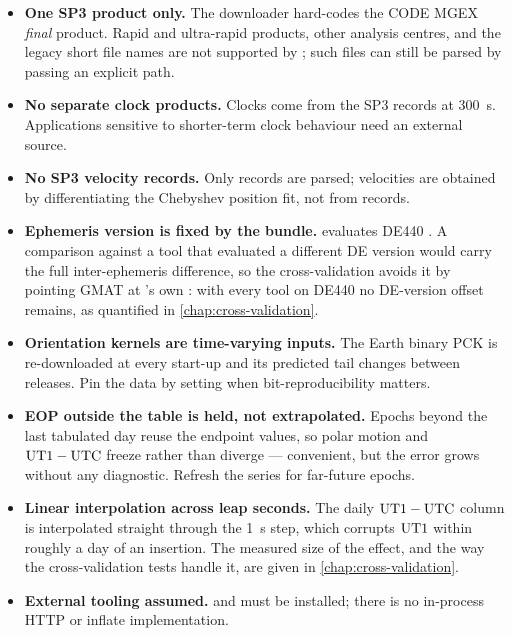 \begin{itemize}[leftmargin=1.4em]
  \item \textbf{One SP3 product only.} The downloader hard-codes the CODE
    MGEX \emph{final} product. Rapid and ultra-rapid products, other analysis
    centres, and the legacy short file names are not supported by
    ; such files can still be parsed by passing an
    explicit path.
  \item \textbf{No separate clock products.} Clocks come from the SP3 records
    at \SI{300}{\second}. Applications sensitive to shorter-term clock
    behaviour need an external  source.
  \item \textbf{No SP3 velocity records.} Only  records are parsed;
    velocities are obtained by differentiating the Chebyshev position fit, not
    from  records.
  \item \textbf{Ephemeris version is fixed by the bundle.} \lupnt{} evaluates
    DE440 \citep{park2021de440}. A comparison against a tool that evaluated a
    different DE version would carry the full inter-ephemeris difference, so
    the cross-validation avoids it by pointing GMAT at \lupnt{}'s own
    : with every tool on DE440 no DE-version offset remains,
    as quantified in \cref{chap:cross-validation}.
  \item \textbf{Orientation kernels are time-varying inputs.} The Earth binary
    PCK is re-downloaded at every start-up and its predicted tail changes
    between releases. Pin the data by setting
     when bit-reproducibility
    matters.
  \item \textbf{EOP outside the table is held, not extrapolated.} Epochs
    beyond the last tabulated day reuse the endpoint values, so polar motion
    and $\mathrm{UT1}-\mathrm{UTC}$ freeze rather than diverge --- convenient, but the error
    grows without any diagnostic. Refresh the series for far-future epochs.
  \item \textbf{Linear interpolation across leap seconds.} The daily
    $\mathrm{UT1}-\mathrm{UTC}$ column is interpolated straight through the \SI{1}{\second}
    step, which corrupts $\mathrm{UT1}$ within roughly a day of an insertion. The
    measured size of the effect, and the way the cross-validation tests handle
    it, are given in \cref{chap:cross-validation}.
  \item \textbf{External tooling assumed.}  and  must be
    installed; there is no in-process HTTP or inflate implementation.
\end{itemize}
